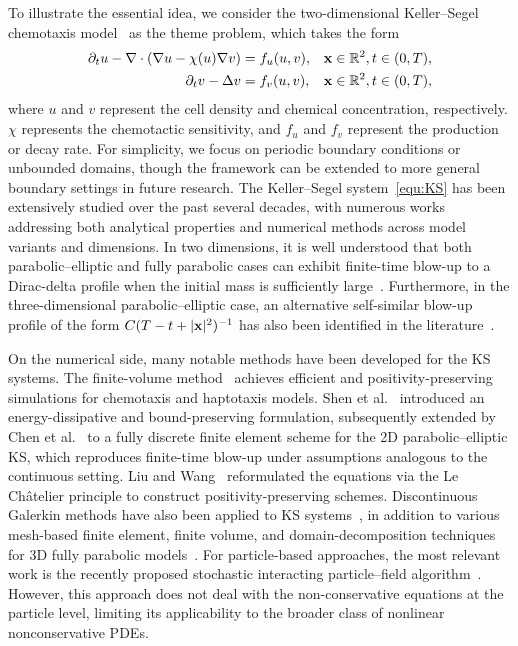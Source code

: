 \documentclass[preprint,12pt]{elsarticle}
\theoremstyle{definition}
\theoremstyle{remark}
\begin{document}
To illustrate the essential idea, we consider the two-dimensional Keller--Segel chemotaxis model~\cite{keller1970initiation, patlak1953random} as the theme problem, which takes the form 
\begin{equation}\label{equ:KS}
\begin{aligned}
\partial_t u - \nabla \cdot ( \nabla u - \chi(u) \nabla v) &= f_u(u,v), & \mathbf{x}\in \mathbb{R}^2 , t\in(0,T), \\
\partial_t v - \Delta v &= f_v(u,v), & \mathbf{x}\in \mathbb{R}^2 , t\in(0,T),
\end{aligned}
\end{equation}
where $u$ and $v$ represent the cell density and chemical concentration, respectively. $\chi$ represents the chemotactic sensitivity, and $f_u$ and $f_v$ represent the production or decay rate.  For simplicity, we focus on periodic boundary conditions or unbounded domains, though the framework can be extended to more general boundary settings in future research. 
The Keller--Segel system~\eqref{equ:KS} has been extensively studied over the past several decades, with numerous works addressing both analytical properties and numerical methods across model variants and dimensions. In two dimensions, it is well understood that both parabolic–elliptic and fully parabolic cases can exhibit finite-time blow-up to a Dirac-delta profile when the initial mass is sufficiently large~\cite{herrero1997blow, perthame2007transport}. Furthermore, in the three-dimensional parabolic–elliptic case, an alternative self-similar blow-up profile of the form $ C(T-t+\vert \mathbf x\vert ^2)^{-1}$ has also been identified in the literature~\cite{giga2011asymptotic,souplet2019blow}. 

On the numerical side, many notable methods have been developed for the KS systems. The finite-volume method~\cite{filbet2006finite,chertock2008second,chertock2018high} achieves efficient and positivity-preserving simulations for chemotaxis and haptotaxis models.  
%
Shen et al.~\cite{shen2020unconditionally} introduced an energy-dissipative and bound-preserving formulation, subsequently extended by Chen et al.~\cite{chen2022error} to a fully discrete finite element scheme for the 2D parabolic–elliptic KS, which reproduces finite-time blow-up under assumptions analogous to the continuous setting. 
Liu and Wang~\cite{liu2018positivity} reformulated the equations via the Le Ch\^atelier principle to construct positivity-preserving schemes. Discontinuous Galerkin methods have also been applied to KS systems~\cite{zhong2024direct, li2017local,epshteyn2009new}, in addition to various mesh-based finite element, finite volume, and domain-decomposition techniques for 3D fully parabolic models~\cite{epshteyn2019efficient, strehl2013positivity}. For particle-based approaches, the most relevant work is the recently proposed stochastic interacting particle–field algorithm~\cite{wang2025novel,hu2024stochastic,chertock2025hybrid}. However, this approach does not deal with the non-conservative equations at the particle level, limiting its applicability to the broader class of nonlinear nonconservative PDEs. 
\end{document}
